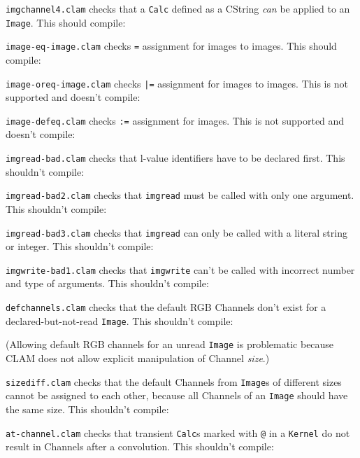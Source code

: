 \texttt{imgchannel4.clam} checks that a \texttt{Calc} defined as a CString \emph{can} be applied to an \texttt{Image}. This should compile:


\texttt{image-eq-image.clam} checks \texttt{=} assignment for images to images. This should compile:


\texttt{image-oreq-image.clam} checks \texttt{|=} assignment for images to images. This is not supported and doesn't compile:


\texttt{image-defeq.clam} checks \texttt{:=} assignment for images. This is not supported and doesn't compile:


\texttt{imgread-bad.clam} checks that l-value identifiers have to be declared first. This shouldn't compile:


\texttt{imgread-bad2.clam} checks that \texttt{imgread} must be called with only one argument. This shouldn't compile:


\texttt{imgread-bad3.clam} checks that \texttt{imgread} can only be called with a literal string or integer. This shouldn't compile:


\texttt{imgwrite-bad1.clam} checks that \texttt{imgwrite} can't be called with incorrect number and type of arguments. This shouldn't compile:


\texttt{defchannels.clam} checks that the default RGB Channels don't exist for a declared-but-not-read \texttt{Image}. This shouldn't compile:

(Allowing default RGB channels for an unread \texttt{Image} is problematic because CLAM
does not allow explicit manipulation of Channel \emph{size}.)

\texttt{sizediff.clam} checks that the default Channels from \texttt{Image}s of different sizes
cannot be assigned to each other, because all Channels of an \texttt{Image} should have the same size. This shouldn't compile:


\texttt{at-channel.clam} checks that transient \texttt{Calc}s marked with \texttt{@} in a \texttt{Kernel}
do not result in Channels after a convolution. This shouldn't compile:


